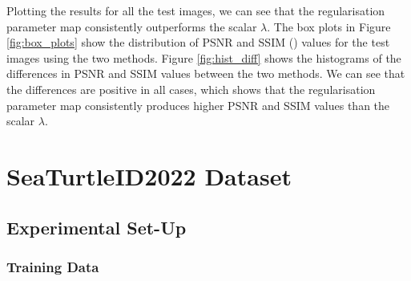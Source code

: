 \documentclass[12pt]{article}
\begin{document}
Plotting the results for all the test images, we can see that the regularisation parameter map consistently outperforms the scalar $\lambda$.
The box plots in Figure 
\ref{fig:box_plots} 
show the distribution of PSNR and SSIM (\cite{ssim}) values for the test images
using the two methods.
Figure 
\ref{fig:hist_diff}
shows the histograms of the differences in PSNR and SSIM values between the two methods.
We can see that the differences are positive in all cases, which shows that the regularisation parameter map consistently produces higher PSNR and SSIM values than the scalar $\lambda$.















\section{SeaTurtleID2022 Dataset}


\subsection{Experimental Set-Up}

\subsubsection{Training Data}
\end{document}
